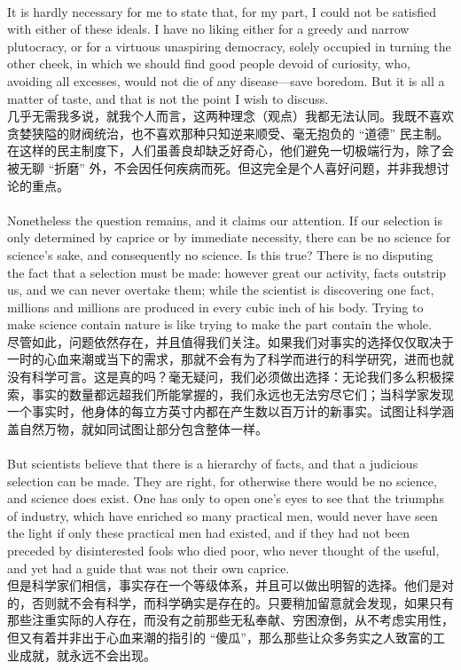 \documentclass{article}
\begin{document}
\\
It is hardly necessary for me to state that, for my part, I could not be satisfied with either of these ideals. I have no liking either for a greedy and narrow plutocracy, or for a virtuous unaspiring democracy, solely occupied in turning the other cheek, in which we should find good people devoid of curiosity, who, avoiding all excesses, would not die of any disease—save boredom. But it is all a matter of taste, and that is not the point I wish to discuss.\\
几乎无需我多说，就我个人而言，这两种理念（观点）我都无法认同。我既不喜欢贪婪狭隘的财阀统治，也不喜欢那种只知逆来顺受、毫无抱负的 “道德” 民主制。在这样的民主制度下，人们虽善良却缺乏好奇心，他们避免一切极端行为，除了会被无聊 “折磨” 外，不会因任何疾病而死。但这完全是个人喜好问题，并非我想讨论的重点。 \\ 

\\
Nonetheless the question remains, and it claims our attention. If our selection is only determined by caprice or by immediate necessity, there can be no science for science’s sake, and consequently no science. Is this true? There is no disputing the fact that a selection must be made: however great our activity, facts outstrip us, and we can never overtake them; while the scientist is discovering one fact, millions and millions are produced in every cubic inch of his body. Trying to make science contain nature is like trying to make the part contain the whole.\\
尽管如此，问题依然存在，并且值得我们关注。如果我们对事实的选择仅仅取决于一时的心血来潮或当下的需求，那就不会有为了科学而进行的科学研究，进而也就没有科学可言。这是真的吗？毫无疑问，我们必须做出选择：无论我们多么积极探索，事实的数量都远超我们所能掌握的，我们永远也无法穷尽它们；当科学家发现一个事实时，他身体的每立方英寸内都在产生数以百万计的新事实。试图让科学涵盖自然万物，就如同试图让部分包含整体一样。\\ 

\\
But scientists believe that there is a hierarchy of facts, and that a judicious selection can be made. They are right, for otherwise there would be no science, and science does exist. One has only to open one’s eyes to see that the triumphs of industry, which have enriched so many practical men, would never have seen the light if only these practical men had existed, and if they had not been preceded by disinterested fools who died poor, who never thought of the useful, and yet had a guide that was not their own caprice.\\
但是科学家们相信，事实存在一个等级体系，并且可以做出明智的选择。他们是对的，否则就不会有科学，而科学确实是存在的。只要稍加留意就会发现，如果只有那些注重实际的人存在，而没有之前那些无私奉献、穷困潦倒，从不考虑实用性，但又有着并非出于心血来潮的指引的 “傻瓜”，那么那些让众多务实之人致富的工业成就，就永远不会出现。 \\ 
\end{document}
